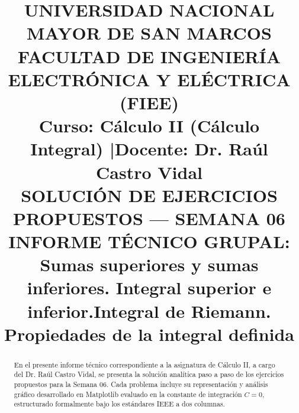 \documentclass[conference]{IEEEtran}
\newcommand{\NumeroSemana}{06}
\newcommand{\TemaSemana}{Sumas superiores y sumas inferiores. Integral superior e inferior.Integral de Riemann. Propiedades de la integral definida}
\begin{document}
	
	\title{UNIVERSIDAD NACIONAL MAYOR DE SAN MARCOS\\
		\Large FACULTAD DE INGENIERÍA ELECTRÓNICA Y ELÉCTRICA (FIEE)\\
		\vspace{0.3cm}
		\large \textbf{Curso:} Cálculo II (Cálculo Integral) \quad|\quad \textbf{Docente:} Dr. Raúl Castro Vidal\\
		\vspace{0.4cm}
		\huge SOLUCIÓN DE EJERCICIOS PROPUESTOS --- SEMANA \NumeroSemana\\
		\LARGE INFORME TÉCNICO GRUPAL: \TemaSemana}
	
	\author{
		\and
		\and
		\vspace{0.4cm}
		\and
		\and
		\and
	}
	
	\maketitle
	
	\begin{abstract}
		En el presente informe técnico correspondiente a la asignatura de Cálculo II, a cargo del Dr. Raúl Castro Vidal, se presenta la solución analítica paso a paso de los ejercicios propuestos para la Semana \NumeroSemana. Cada problema incluye su representación y análisis gráfico desarrollado en Matplotlib evaluado en la constante de integración $C=0$, estructurado formalmente bajo los estándares IEEE a dos columnas.
	\end{abstract}
	
\end{document}
